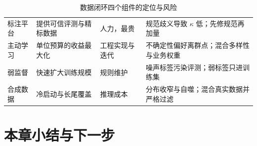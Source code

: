 \begin{table}[htbp]
\centering
\caption{数据闭环四个组件的定位与风险}
\label{tab:data-loop}
\small
\begin{tabularx}{\textwidth}{L{1.9cm} L{2.5cm} L{2.3cm} Y}
\toprule
{} &  &  &  \\
\midrule
标注平台 & 提供可信评测与精标数据 & 人力，最贵 & 规范歧义导致 $\kappa$ 低；先修规范再加量 \\
\addlinespace
主动学习 & 单位预算的收益最大化 & 工程实现与迭代 & 不确定性偏好离群点；混合多样性与业务权重 \\
\addlinespace
弱监督 & 快速扩大训练规模 & 规则维护 & 噪声标签污染评测；弱标签只进训练集 \\
\addlinespace
合成数据 & 冷启动与长尾覆盖 & 推理成本 & 分布收窄与自噬；混合真实数据并严格过滤 \\
\bottomrule
\end{tabularx}
\end{table}

\section{本章小结与下一步}

